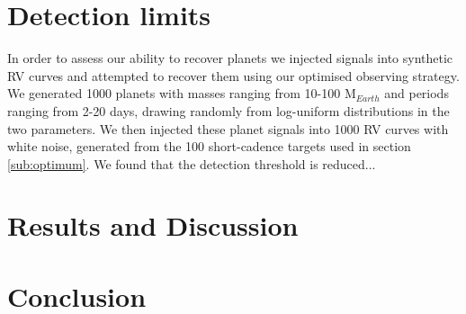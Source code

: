 \documentclass[useAMS, usenatbib]{aastex}
\begin{document}
\section{Detection limits}
\label{section:detection}

In order to assess our ability to recover planets we injected signals into
synthetic RV curves and attempted to recover them using our optimised observing
strategy.
We generated 1000 planets with masses ranging from 10-100 M$_{Earth}$ and
periods ranging from 2-20 days, drawing randomly from log-uniform
distributions in the two parameters.
We then injected these planet signals into 1000 RV curves with white noise,
generated from the 100 short-cadence targets used in section \ref{sub:optimum}.
We found that the detection threshold is reduced...

\section{Results and Discussion}
\label{results}

\section{Conclusion}
\label{conclusion}



\end{document}
